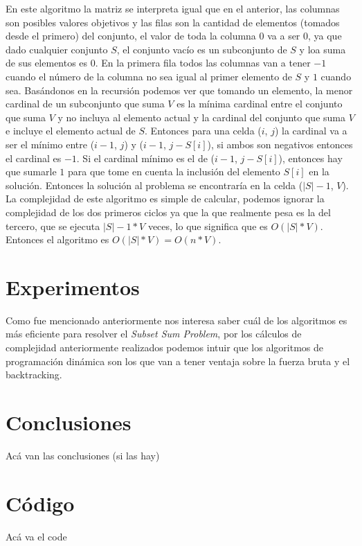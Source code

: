 \documentclass[a4paper]{article}
\begin{document}
En este algoritmo la matriz se interpreta igual que en el anterior, las columnas son posibles valores objetivos y las filas son la cantidad de elementos (tomados desde el primero) del conjunto, el valor de toda la columna $0$ va a ser $0$, ya que dado cualquier conjunto $S$, el conjunto vacío es un subconjunto de $S$ y loa suma de sus elementos es $0$. En la primera fila todos las columnas van a tener $-1$ cuando el número de la columna no sea igual al primer elemento de $S$ y $1$ cuando sea. Basándonos en la recursión podemos ver que tomando un elemento, la menor cardinal de un subconjunto que suma $V$ es la mínima cardinal entre el conjunto que suma $V$ y no incluya al elemento actual y la cardinal del conjunto que suma $V$ e incluye el elemento actual de $S$. Entonces para una celda ($i$, $j$) la cardinal va a ser el mínimo entre ($i-1$, $j$) y
($i-1$, $j-S[i]$), si ambos son negativos entonces el cardinal es $-1$. Si el cardinal mínimo es el de ($i-1$, $j-S[i]$), entonces hay que sumarle $1$ para que tome en cuenta la inclusión del elemento $S[i]$ en la solución. Entonces la solución al problema se encontraría en la celda ($|S|-1$, $V$).
\\
La complejidad de este algoritmo es simple de calcular, podemos ignorar la complejidad de los dos primeros ciclos ya que la que realmente pesa es la del tercero, que se ejecuta $|S|-1 * V$ veces, lo que significa que es $O(|S|*V)$.
\\
Entonces el algoritmo es $O(|S|*V) = O(n*V)$.

\section{Experimentos}
Como fue mencionado anteriormente nos interesa saber cuál de los algoritmos es más eficiente para resolver el \textit{Subset Sum Problem}, por los cálculos de complejidad anteriormente realizados podemos intuir que los algoritmos de programación dinámica son los que van a tener ventaja sobre la fuerza bruta y el backtracking.
\\


\section{Conclusiones}
Acá van las conclusiones (si las hay)
\section{Código}
Acá va el code
\end{document}
